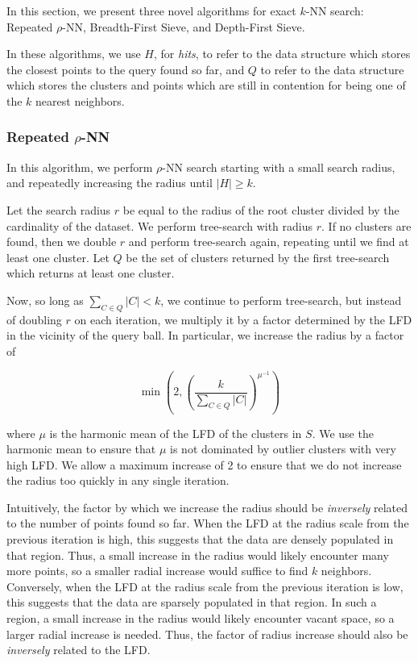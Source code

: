 In this section, we present three novel algorithms for exact $k$-NN search:
Repeated $\rho$-NN, Breadth-First Sieve, and Depth-First Sieve.

In these algorithms, we use $H$, for \textit{hits}, to refer to the data structure which stores the closest points to the query found so far, and $Q$ to refer to the data structure which stores the clusters and points which are still in contention for being one of the $k$ nearest neighbors.


\subsubsection{Repeated \texorpdfstring{$\rho$}{p}-NN}
\label{sec:methods:knn-search:repeated-rnn}

In this algorithm, we perform $\rho$-NN search starting with a small search radius, and repeatedly increasing the radius until $|H| \geq k$.

Let the search radius $r$ be equal to the radius of the root cluster divided by the cardinality of the dataset.
We perform tree-search with radius $r$.
If no clusters are found, then we double $r$ and perform tree-search again, repeating until we find at least one cluster.
Let $Q$ be the set of clusters returned by the first tree-search which returns at least one cluster.

Now, so long as $\sum_{C \in Q} |C| < k$, we continue to perform tree-search, but instead of doubling $r$ on each iteration, we multiply it by a factor determined by the LFD in the vicinity of the query ball. 
In particular, we increase the radius by a factor of

\begin{equation}
    \min \left(2, \left( {\frac{k}{\sum_{C \in Q} |C|}} \right)^{\mu^{-1}} \right)
    \label{eq:methods:repeated-rnn-factor}
\end{equation}

where $\mu$ is the harmonic mean of the LFD of the clusters in $S$.
We use the harmonic mean to ensure that $\mu$ is not dominated by outlier clusters with very high LFD.
We allow a maximum increase of 2 to ensure that we do not increase the radius too quickly in any single iteration.

Intuitively, the factor by which we increase the radius should be \textit{inversely} related to the number of points found so far. 
When the LFD at the radius scale from the previous iteration is high, this suggests that the data are densely populated in that region.
Thus, a small increase in the radius would likely encounter many more points, so a smaller radial increase would suffice to find $k$ neighbors.
Conversely, when the LFD at the radius scale from the previous iteration is low, this suggests that the data are sparsely populated in that region.
In such a region, a small increase in the radius would likely encounter vacant space, so a larger radial increase is needed.
Thus, the factor of radius increase should also be \textit{inversely} related to the LFD.

